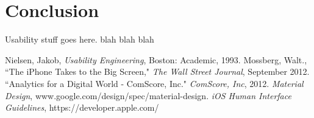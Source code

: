 \documentclass[a4paper; 11pt]{article}
\begin{document}
\section{Conclusion}
Usability stuff goes here. blah blah blah
\clearpage
\begin{thebibliography}{100} %
 Nielsen, Jakob, \emph{Usability Engineering}, Boston: Academic, 1993.
 Mossberg, Walt., ``The iPhone Takes to the Big Screen," \emph{The Wall Street Journal}, September 2012.
``Analytics for a Digital World - ComScore, Inc." \emph{ComScore, Inc}, 2012.
 \emph{Material Design}, www.google.com/design/spec/material-design.
 \emph{iOS Human Interface Guidelines}, https://developer.apple.com/
\end{thebibliography}
\end{document}
